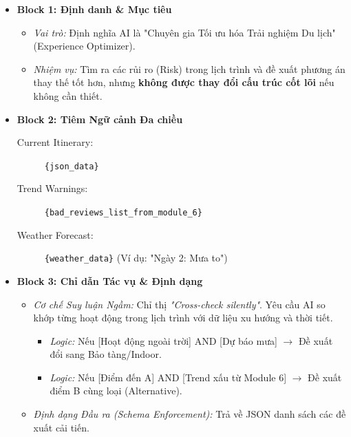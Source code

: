 \begin{itemize}
    \item \textbf{Block 1: Định danh \& Mục tiêu}
    \begin{itemize}
        \item \textit{Vai trò:} Định nghĩa AI là "Chuyên gia Tối ưu hóa Trải nghiệm Du lịch" (Experience Optimizer).
        \item \textit{Nhiệm vụ:} Tìm ra các rủi ro (Risk) trong lịch trình và đề xuất phương án thay thế tốt hơn, nhưng \textbf{không được thay đổi cấu trúc cốt lõi} nếu không cần thiết.
    \end{itemize}
    
    \item \textbf{Block 2: Tiêm Ngữ cảnh Đa chiều}
    \begin{description}
        \item[Current Itinerary:] \texttt{\{json\_data\}}
        \item[Trend Warnings:] \texttt{\{bad\_reviews\_list\_from\_module\_6\}}
        \item[Weather Forecast:] \texttt{\{weather\_data\}} (Ví dụ: "Ngày 2: Mưa to")
    \end{description}
    
    \item \textbf{Block 3: Chỉ dẫn Tác vụ \& Định dạng}
    \begin{itemize}
        \item \textit{Cơ chế Suy luận Ngầm:} Chỉ thị \textit{"Cross-check silently"}. Yêu cầu AI so khớp từng hoạt động trong lịch trình với dữ liệu xu hướng và thời tiết.
        \begin{itemize}
            \item \textit{Logic:} Nếu [Hoạt động ngoài trời] AND [Dự báo mưa] $\rightarrow$ Đề xuất đổi sang Bảo tàng/Indoor.
            \item \textit{Logic:} Nếu [Điểm đến A] AND [Trend xấu từ Module 6] $\rightarrow$ Đề xuất điểm B cùng loại (Alternative).
        \end{itemize}
        \item \textit{Định dạng Đầu ra (Schema Enforcement):} Trả về JSON danh sách các đề xuất cải tiến.
    \end{itemize}
\end{itemize}
